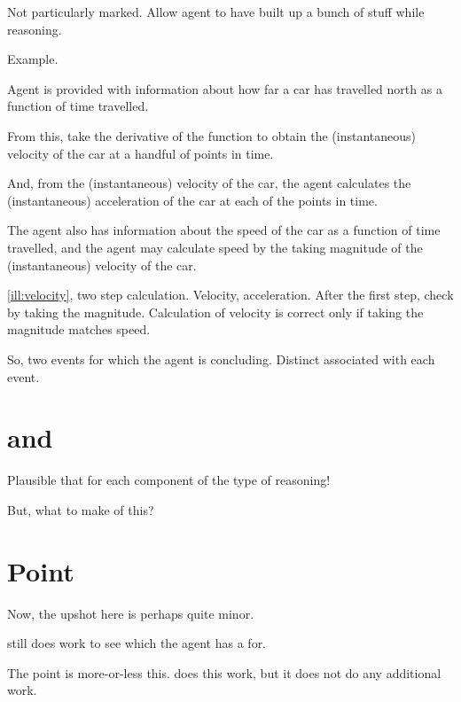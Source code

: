 \begin{note}
  Not particularly marked.
  Allow agent to have built up a bunch of stuff while reasoning.

  Example.

  \begin{illustration}[Velocity]
    \label{ill:velocity}
    Agent is provided with information about how far a car has travelled north as a function of time travelled.

    From this, take the derivative of the function to obtain the (instantaneous) velocity of the car at a handful of points in time.

    And, from the (instantaneous) velocity of the car, the agent calculates the (instantaneous) acceleration of the car at each of the points in time.

    The agent also has information about the speed of the car as a function of time travelled, and the agent may calculate speed by the taking magnitude of the (instantaneous) velocity of the car.
  \end{illustration}

  \autoref{ill:velocity}, two step calculation.
  Velocity, acceleration.
  After the first step, check by taking the magnitude.
  Calculation of velocity is correct only if taking the magnitude matches speed.

  So, two events for which the agent is concluding.
  Distinct  associated with each event.
\end{note}

\section{ and }
\label{sec:sr2}

\begin{note}
  Plausible that \wit{} for each component of the type of reasoning!

  But, what to make of this?
\end{note}

\section{Point}
\label{sec:point}

\begin{note}
  Now, the upshot here is perhaps quite minor.

  \issueConstraint{} still does work to see which \ros{} the agent has a \wit{} for.

  The point is more-or-less this.
  \issueConstraint{} does this work, but it does not do any additional work.
\end{note}

